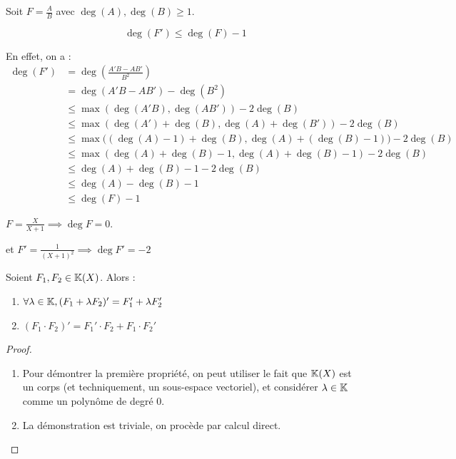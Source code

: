 \documentclass[12pt, a4paper]{report}
\begin{document}
\begin{remark}
    Soit $F = \frac AB$ avec $\deg(A),\deg(B) \ge 1$.

    $$\deg(F') \le \deg(F) - 1$$

    En effet, on a :
    \begin{align*}
    \deg(F') &= \deg(\frac{A'B - AB'}{B^2})\\
    &= \deg(A'B - AB') - \deg(B^2)\\
    &\leq \max(\deg(A'B), \deg(AB')) - 2\deg(B)\\
    &\le \max(\deg(A') + \deg(B), \deg(A) + \deg(B')) - 2\deg(B)\\
    &\le \max\bigl((\deg(A) - 1) + \deg(B), \deg(A) + (\deg(B) - 1)\bigr) - 2\deg(B)\\
    &\le \max(\deg(A) + \deg(B) - 1, \deg(A) + \deg(B) - 1) - 2\deg(B)\\
    &\le \deg(A) + \deg(B) - 1 - 2\deg(B)\\
    &\le \deg(A) - \deg(B) - 1\\
    &\le \deg(F) - 1
    \end{align*}
\end{remark}

\begin{example}
    $F = \frac{X}{X+1} \implies \deg F = 0$.

    et $F' = \frac{1}{(X+1)^2} \implies \deg F' = -2$
\end{example}

\begin{property}
    Soient $F_1,F_2 \in \mathbb{K}(X)$. Alors :

    \begin{enumerate}
        \item $\forall \lambda \in\mathbb{K}, (F_1 + \lambda F_2)' = F_1' + \lambda F_2'$
        \item $(F_1 \cdot F_2)' = F_1' \cdot F_2 + F_1 \cdot F_2'$
    \end{enumerate}
\end{property}

\begin{proof}
    \begin{enumerate}
        \item Pour démontrer la première propriété, on peut utiliser le fait que $\mathbb{K}(X)$ est un corps (et techniquement, un sous-espace vectoriel), et considérer $\lambda \in \mathbb{K}$ comme un polynôme de degré $0$.
        \item La démonstration est triviale, on procède par calcul direct.
    \end{enumerate}
\end{proof}
\end{document}
